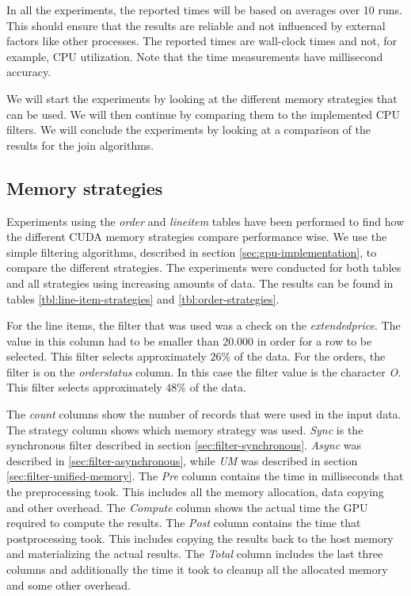 \documentclass[a4paper,titlepage]{article}
\begin{document}
In all the experiments, the reported times will be based on averages over 10 runs. This should ensure that the results are reliable and not influenced by external factors like other processes. The reported times are wall-clock times and not, for example, CPU utilization. Note that the time measurements have millisecond accuracy.

We will start the experiments by looking at the different memory strategies that can be used. We will then continue by comparing them to the implemented CPU filters. We will conclude the experiments by looking at a comparison of the results for the join algorithms.

\subsection{Memory strategies}
Experiments using the \emph{order} and \emph{lineitem} tables have been performed to find how the different CUDA memory strategies compare performance wise. We use the simple filtering algorithms, described in section \ref{sec:gpu-implementation}, to compare the different strategies. The experiments were conducted for both tables and all strategies using increasing amounts of data. The results can be found in tables \ref{tbl:line-item-strategies} and \ref{tbl:order-strategies}.

For the line items, the filter that was used was a check on the \emph{extendedprice}. The value in this column had to be smaller than 20.000 in order for a row to be selected. This filter selects approximately $26\%$ of the data. For the orders, the filter is on the \emph{orderstatus} column. In this case the filter value is the character \emph{O}. This filter selects approximately $48\%$ of the data.

The \emph{count} columns show the number of records that were used in the input data. The strategy column shows which memory strategy was used. \emph{Sync} is the synchronous filter described in section \ref{sec:filter-synchronous}. \emph{Async} was described in \ref{sec:filter-asynchronous}, while \emph{UM} was described in section \ref{sec:filter-unified-memory}. The \emph{Pre} column contains the time in milliseconds that the preprocessing took. This includes all the memory allocation, data copying and other overhead. The \emph{Compute} column shows the actual time the GPU required to compute the results. The \emph{Post} column contains the time that postprocessing took. This includes copying the results back to the host memory and materializing the actual results. The \emph{Total} column includes the last three columns and additionally the time it took to cleanup all the allocated memory and some other overhead.
\end{document}
